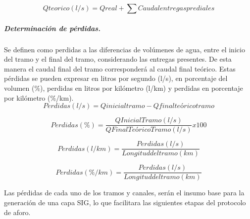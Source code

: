 \documentclass[]{article}
\begin{document}
\begin{equation}
Q teorico (l/s) = Q real + \sum{Caudal entregas prediales}
\end{equation}

\subparagraph{Determinación de pérdidas.}
Se definen como perdidas a las diferencias de volúmenes de agua, entre el inicio del tramo y el final del tramo, considerando las entregas presentes. De esta manera el caudal final del tramo corresponderá al caudal final teórico. Estas pérdidas se pueden expresar en litros por segundo (l/s), en porcentaje del volumen (\%), perdidas en litros por kilómetro (l/km) y perdidas en porcentaje por kilómetro (\%/km).\\

\begin{equation}
Perdidas (l/s) = Q inicial tramo - Q final teórico tramo 
\end{equation}

\begin{equation}
Perdidas (\%) = \frac{Q Inicial Tramo (l/s)}{ Q Final Teórico Tramo (l/s)} x 100
\end{equation}

\begin{equation}
Perdidas (l/km) = \frac{Perdidas (l/s)}{Longitud del tramo (km)}
\end{equation}

\begin{equation}
Perdidas (\%/km) = \frac{Perdidas (l/s)}{Longitud del tramo (km)}
\end{equation}

Las pérdidas de cada uno de los tramos y canales, serán el insumo base para la generación de una capa SIG, lo que facilitara las siguientes etapas del protocolo de aforo.

\end{document}

